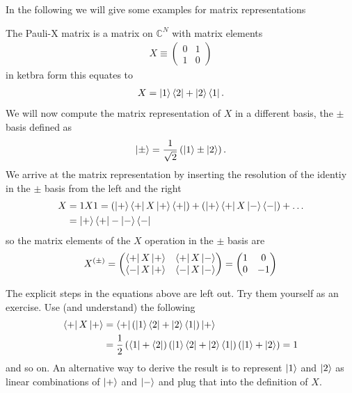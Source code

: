 In the following we will give some examples for matrix representations
\begin{ex*}[$X$ matrix] The Pauli-X matrix is a matrix on $\mathbb{C}^N$ with matrix elements
\begin{align*}
    X \equiv \begin{pmatrix}
        0 & 1\\ 1 & 0
    \end{pmatrix}
\end{align*}
in ketbra form this equates to
\begin{align*}
    X = \ket{1}\bra{2} + \ket{2}\bra{1}.
\end{align*}
We will now compute the matrix representation of $X$ in a different basis, the $\pm$ basis defined as
\begin{align*}
    \ket{\pm} = \frac{1}{\sqrt{2}}\left(\ket{1} \pm \ket{2}\right).
\end{align*}
We arrive at the matrix representation by inserting the resolution of the identiy in the $\pm$ basis from the left and the right
\begin{align*}
    X &= 1 X 1 = \left(\ket{+}\bra{+}X\ket{+}\bra{+}\right) + \left(\ket{+}\bra{+}X\ket{-}\bra{-}\right) + \dots \\
    & = \ket{+}\bra{+} - \ket{-}\bra{-}
\end{align*}
so the matrix elements of the $X$ operation in the $\pm$ basis are
\begin{align*}
    X^{(\pm)} = \begin{pmatrix}
        \bra{+}X\ket{+} & \bra{+}X\ket{-}\\
        \bra{-}X\ket{+} & \bra{-}X\ket{-}
    \end{pmatrix}=\begin{pmatrix}1 & 0 \\ 0 & -1\end{pmatrix}
\end{align*}

\end{ex*}
The explicit steps in the equations above are left out. Try them yourself as an exercise. Use (and understand) the following
\begin{align}
    \bra{+}X\ket{+} &= \bra{+}\left(\ket{1}\bra{2} + \ket{2}\bra{1}\right)\ket{+} \\
    &= \frac{1}{2}\left(\bra{1} + \bra{2}\right)\left(\ket{1}\bra{2} + \ket{2}\bra{1}\right)\left(\ket{1} + \ket{2}\right) = 1
\end{align}
and so on.
An alternative way to derive the result is to represent $\ket{1}$ and $\ket{2}$ as linear combinations of $\ket{+}$ and $\ket{-}$ and plug that into the definition of $X$.

